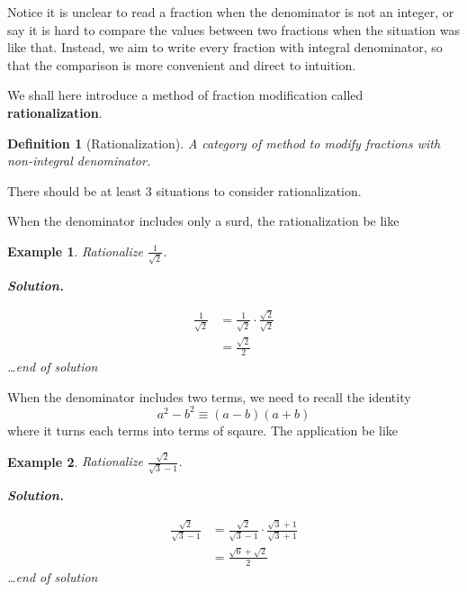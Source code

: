 \documentclass[12pt]{article}
\newtheorem{definition}{Definition}[section]
\newtheorem*{example}{Example}
\newenvironment{solution}{\begin{snugshade*} \textbf{Solution.} \par}{\hfill \textit{\dots end of solution} \end{snugshade*}}
\begin{document}
    Notice it is unclear to read a fraction when the denominator is not an integer, or say it is hard to compare the values between two fractions when the situation was like that. Instead, we aim to write every fraction with integral denominator, so that the comparison is more convenient and direct to intuition.

    We shall here introduce a method of fraction modification called \textbf{rationalization}.

    \begin{definition}[Rationalization]
        A category of method to modify fractions with non-integral denominator.
    \end{definition}

    There should be at least 3 situations to consider rationalization.

    When the denominator includes only a surd, the rationalization be like

    \begin{example}
        Rationalize $\frac{1}{\sqrt{2}}$.

        \begin{solution}
            \begin{align*}
                \frac{1}{\sqrt{2}}&=\frac{1}{\sqrt{2}}\cdot \frac{\sqrt{2}}{\sqrt{2}}\\
                &=\frac{\sqrt{2}}{2}
            \end{align*}
        \end{solution}
    \end{example}

    When the denominator includes two terms, we need to recall the identity \[a^2-b^2\equiv (a-b)(a+b)\] where it turns each terms into terms of sqaure. The application be like

    \begin{example}
        Rationalize $\frac{\sqrt{2}}{\sqrt{3}-1}$.

        \begin{solution}
            \begin{align*}
                \frac{\sqrt{2}}{\sqrt{3}-1}&=\frac{\sqrt{2}}{\sqrt{3}-1}\cdot \frac{\sqrt{3}+1}{\sqrt{3}+1}\\
                &=\frac{\sqrt{6}+\sqrt{2}}{2}
            \end{align*}
        \end{solution}
    \end{example}
\end{document}
